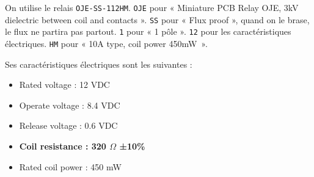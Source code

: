 \documentclass{../../template/labo}
\begin{document}
{
	On utilise le relais \texttt{OJE-SS-112HM}. 
	\texttt{OJE} pour « Miniature PCB Relay OJE, 3kV dielectric between coil and contacts ».
	\texttt{SS} pour « Flux proof », quand on le brase, le flux ne partira pas partout.
	\texttt{1} pour « 1 pôle ».
	\texttt{12} pour les caractéristiques électriques.
	\texttt{HM} pour « 10A type, coil power 450mW~».

	Ses caractéristiques électriques sont les suivantes :
	\begin{itemize}
		\item Rated voltage : 12 VDC
		\item Operate voltage : 8.4 VDC
		\item Release voltage : 0.6 VDC
		\item \textbf{Coil resistance : 320 $\Omega$ ±10\%}
		\item Rated coil power :  450 mW
	\end{itemize}
}
\end{document}
